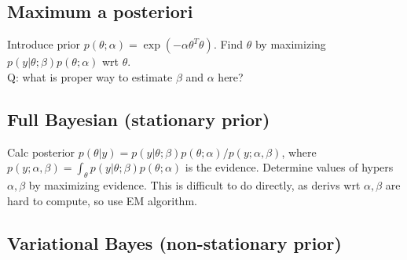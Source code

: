 \documentclass[11pt]{article}
\begin{document}
\begin{appendices}
\subsection{Maximum a posteriori}
Introduce prior $p(\theta ; \alpha) = \exp(-\alpha \theta^T \theta)$. Find
$\theta$ by maximizing $p(y | \theta ; \beta) p(\theta ; \alpha)$ wrt $\theta$.
\\
Q: what is proper way to estimate $\beta$ and $\alpha$ here?

\subsection{Full Bayesian (stationary prior)}
Calc posterior
$p(\theta | y) = p(y | \theta ; \beta) p(\theta ; \alpha) / p(y ; \alpha,
\beta)$, where
$p(y ; \alpha, \beta) = \int_\theta p(y | \theta ; \beta) p(\theta ; \alpha)$ is
the evidence. Determine values of hypers $\alpha, \beta$ by maximizing
evidence. This is difficult to do directly, as derivs wrt $\alpha, \beta$ are
hard to compute, so use EM algorithm.

\subsection{Variational Bayes (non-stationary prior)}

\end{appendices}
\end{document}
